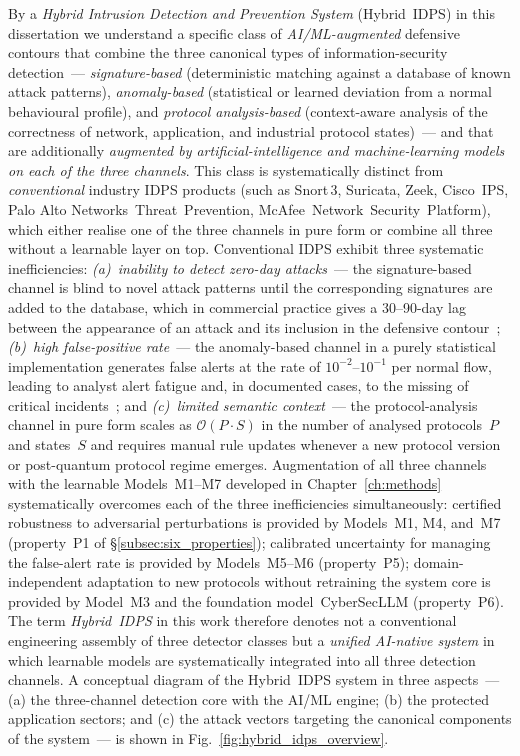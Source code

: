 By a \emph{Hybrid Intrusion Detection and Prevention System}
(Hybrid~IDPS) in this dissertation we understand a specific class of
\emph{AI/ML-augmented} defensive contours that combine the three
canonical types of information-security detection~---
\emph{signature-based} (deterministic matching against a database of
known attack patterns), \emph{anomaly-based} (statistical or learned
deviation from a normal behavioural profile), and \emph{protocol
analysis-based} (context-aware analysis of the correctness of
network, application, and industrial protocol states)~--- and that
are additionally \emph{augmented by artificial-intelligence and
machine-learning models on each of the three channels}. This class
is systematically distinct from \emph{conventional} industry IDPS
products (such as \mbox{Snort\,3}, Suricata, Zeek, Cisco~IPS, Palo
Alto Networks~Threat~Prevention, McAfee~Network~Security~Platform),
which either realise one of the three channels in pure form or
combine all three without a learnable layer on top. Conventional
IDPS exhibit three systematic inefficiencies:
\emph{(a)~inability to detect zero-day attacks}~--- the
signature-based channel is blind to novel attack patterns until the
corresponding signatures are added to the database, which in
commercial practice gives a 30--90-day lag between the appearance of
an attack and its inclusion in the defensive
contour~\cite{Sachkov2022threat};
\emph{(b)~high false-positive rate}~--- the anomaly-based channel
in a purely statistical implementation generates false alerts at
the rate of $10^{-2}$--$10^{-1}$ per normal flow, leading to
analyst alert fatigue and, in documented cases, to the missing of
critical incidents~\cite{FerragPoisoning2023}; and
\emph{(c)~limited semantic context}~--- the protocol-analysis
channel in pure form scales as $\mathcal{O}(P\cdot S)$ in the
number of analysed protocols~$P$ and states~$S$ and requires
manual rule updates whenever a new protocol version or post-quantum
protocol regime emerges. Augmentation of all three channels with
the learnable Models~M1--M7 developed in Chapter~\ref{ch:methods}
systematically overcomes each of the three inefficiencies
simultaneously: certified robustness to adversarial perturbations
is provided by Models~M1, M4, and~M7 (property~P1 of
\S\ref{subsec:six_properties}); calibrated uncertainty for managing
the false-alert rate is provided by Models~M5--M6 (property~P5);
domain-independent adaptation to new protocols without retraining
the system core is provided by Model~M3 and the
foundation model~CyberSecLLM (property~P6). The term
\emph{Hybrid~IDPS} in this work therefore denotes not a conventional
engineering assembly of three detector classes but a \emph{unified
AI-native system} in which learnable models are systematically
integrated into all three detection channels. A conceptual diagram
of the Hybrid~IDPS system in three aspects~--- (a) the three-channel
detection core with the AI/ML engine; (b) the protected application
sectors; and (c) the attack vectors targeting the canonical
components of the system~--- is shown in
Fig.~\ref{fig:hybrid_idps_overview}.

